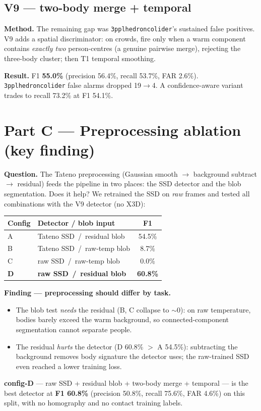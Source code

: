 \documentclass[11pt, a4paper]{article}
\begin{document}
\subsection{V9 --- two-body merge + temporal}
\label{sec:v9}
\textbf{Method.} The remaining gap was \texttt{3pplhedroncolider}'s sustained
false positives. V9 adds a spatial discriminator: on crowds, fire only when a
warm component contains \emph{exactly two} person-centres (a genuine pairwise
merge), rejecting the three-body cluster; then T1 temporal smoothing.

\textbf{Result.} F1 \textbf{55.0\%} (precision 56.4\%, recall 53.7\%, FAR 2.6\%).
\texttt{3pplhedroncolider} false alarms dropped 19$\to$4. A
confidence-aware variant trades to recall 73.2\% at F1 54.1\%.

\section{Part C — Preprocessing ablation (key finding)}
\label{sec:prep}
\textbf{Question.} The Tateno preprocessing (Gaussian smooth $\to$ background
subtract $\to$ residual) feeds the pipeline in two places: the SSD detector and
the blob segmentation. Does it help? We retrained the SSD on \emph{raw} frames
and tested all combinations with the V9 detector (no X3D):

\begin{center}\renewcommand{\arraystretch}{1.15}
\begin{tabular}{l l c}
\toprule
\textbf{Config} & \textbf{Detector / blob input} & \textbf{F1} \\
\midrule
A & Tateno SSD\, /\, residual blob & 54.5\% \\
B & Tateno SSD\, /\, raw-temp blob & 8.7\% \\
C & raw SSD\, /\, raw-temp blob    & 0.0\% \\
\rowcolor{rowhi}\textbf{D} & \textbf{raw SSD\, /\, residual blob} & \textbf{60.8\%} \\
\bottomrule
\end{tabular}\end{center}

\textbf{Finding --- preprocessing should differ by task.}
\begin{itemize}[leftmargin=1.4em, itemsep=1pt]
\item The blob test \emph{needs} the residual (B, C collapse to $\sim$0): on raw
      temperature, bodies barely exceed the warm background, so connected-component
      segmentation cannot separate people.
\item The residual \emph{hurts} the detector (D 60.8\% $>$ A 54.5\%): subtracting
      the background removes body signature the detector uses; the raw-trained SSD
      even reached a lower training loss.
\end{itemize}
\textbf{config-D} --- raw SSD + residual blob + two-body merge + temporal --- is
the best detector at \textbf{F1 60.8\%} (precision 50.8\%, recall 75.6\%,
FAR 4.6\%) on this split, with no homography and no contact training labels.
\end{document}

